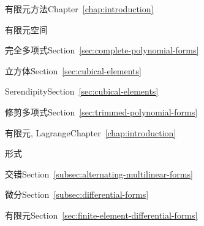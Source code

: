 \begin{theindex}
\item {}\label{index:finite-element-method}{有限元方法}\quad Chapter~\ref{chap:introduction}

\item {}\label{index:finite-element-space}{有限元空间}

\subitem {}\label{index:finite-element-space-complete-polynomial}{完全多项式}\quad Section~\ref{sec:complete-polynomial-forms}

\subitem {}\label{index:finite-element-space-cubical}{立方体}\quad Section~\ref{sec:cubical-elements}

\subitem {}\label{index:finite-element-space-serendipity}{Serendipity}\quad Section~\ref{sec:cubical-elements}

\subitem {}\label{index:finite-element-space-trimmed-polynomial}{修剪多项式}\quad Section~\ref{sec:trimmed-polynomial-forms}

\item {}\label{index:finite-elements-lagrange}{有限元, Lagrange}\quad Chapter~\ref{chap:introduction}

\item {}\label{index:form}{形式}

\subitem {}\label{index:form-alternating}{交错}\quad Section~\ref{subsec:alternating-multilinear-forms}

\subitem {}\label{index:form-differential}{微分}\quad Section~\ref{subsec:differential-forms}

\subsubitem {}\label{index:form-differential-finite-element}{有限元}\quad Section~\ref{sec:finite-element-differential-forms}


\end{theindex}
